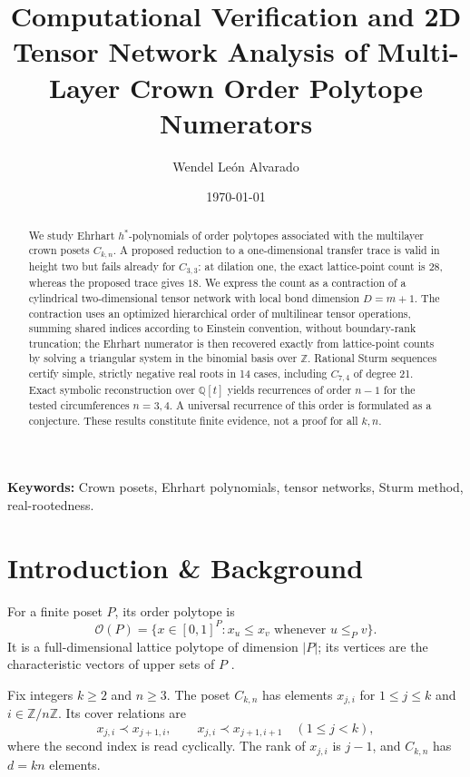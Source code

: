 \documentclass[11pt,a4paper]{article}
\title{Computational Verification and 2D Tensor Network Analysis of Multi-Layer Crown Order Polytope Numerators}
\author{Wendel León Alvarado}
\date{\today}
\theoremstyle{definition}
\begin{document}
\maketitle

\begin{abstract}
We study Ehrhart $h^*$-polynomials of order polytopes associated with the multilayer crown posets $C_{k,n}$. A proposed reduction to a one-dimensional transfer trace is valid in height two but fails already for $C_{3,3}$: at dilation one, the exact lattice-point count is $28$, whereas the proposed trace gives $18$. We express the count as a contraction of a cylindrical two-dimensional tensor network with local bond dimension $D=m+1$. The contraction uses an optimized hierarchical order of multilinear tensor operations, summing shared indices according to Einstein convention, without boundary-rank truncation; the Ehrhart numerator is then recovered exactly from lattice-point counts by solving a triangular system in the binomial basis over $\mathbb{Z}$. Rational Sturm sequences certify simple, strictly negative real roots in 14 cases, including $C_{7,4}$ of degree 21. Exact symbolic reconstruction over $\mathbb{Q}[t]$ yields recurrences of order $n-1$ for the tested circumferences $n=3,4$. A universal recurrence of this order is formulated as a conjecture. These results constitute finite evidence, not a proof for all $k,n$.
\end{abstract}

\small\noindent\textbf{Keywords:} Crown posets, Ehrhart polynomials, tensor networks, Sturm method, real-rootedness.
\normalsize

\section{Introduction \& Background}

For a finite poset $P$, its order polytope is
\begin{equation}
\mathcal{O}(P)=\{x\in[0,1]^P : x_u\le x_v\text{ whenever }u\le_P v\}.
\end{equation}
It is a full-dimensional lattice polytope of dimension $|P|$; its vertices are the characteristic vectors of upper sets of $P$ \cite{Stanley1986}.

Fix integers $k\ge2$ and $n\ge3$. The poset $C_{k,n}$ has elements $x_{j,i}$ for $1\le j\le k$ and $i\in\mathbb{Z}/n\mathbb{Z}$. Its cover relations are
\begin{equation}
x_{j,i}\prec x_{j+1,i},\qquad x_{j,i}\prec x_{j+1,i+1}
\quad (1\le j<k),
\end{equation}
where the second index is read cyclically. The rank of $x_{j,i}$ is $j-1$, and $C_{k,n}$ has $d=kn$ elements.
\end{document}
